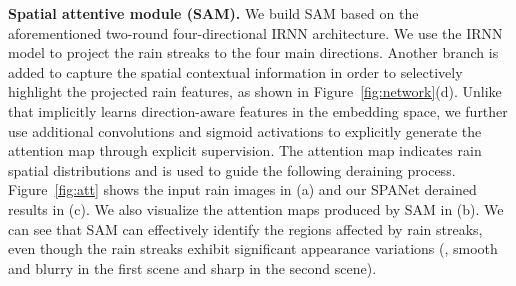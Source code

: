 \documentclass[10pt,twocolumn,letterpaper]{article}
\begin{document}
{\bf Spatial attentive module (SAM).} We build SAM based on the aforementioned two-round four-directional IRNN architecture. We use the IRNN model to project the rain streaks to the four main directions. Another branch is added to capture the spatial contextual information in order to selectively highlight the projected rain features, as shown in Figure~\ref{fig:network}(d).
Unlike~\cite{hu:cvpr:2018:dsc} that implicitly learns direction-aware features in the embedding space, we further use additional convolutions and sigmoid activations to explicitly generate the attention map through explicit supervision. The attention map indicates rain spatial distributions and is used to guide the following deraining process. 
Figure~\ref{fig:att} shows the input rain images in (a) and our SPANet derained results in (c). We also visualize the attention maps produced by SAM in (b). We can see that SAM can effectively identify the regions affected by rain streaks, even though the rain streaks exhibit significant appearance variations (\ie, smooth and blurry in the first scene and sharp in the second scene).
\end{document}
